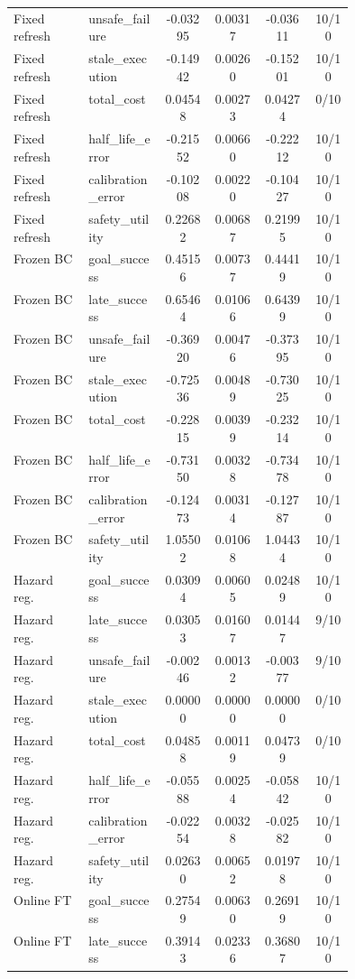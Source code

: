 \documentclass{article}
\begin{document}
\begin{center}
\begin{longtable}{p{0.22\linewidth}p{0.22\linewidth}cccc}
Fixed refresh & unsafe\_failure & -0.03295 & 0.00317 & -0.03611 & 10/10\\
Fixed refresh & stale\_execution & -0.14942 & 0.00260 & -0.15201 & 10/10\\
Fixed refresh & total\_cost & 0.04548 & 0.00273 & 0.04274 & 0/10\\
Fixed refresh & half\_life\_error & -0.21552 & 0.00660 & -0.22212 & 10/10\\
Fixed refresh & calibration\_error & -0.10208 & 0.00220 & -0.10427 & 10/10\\
Fixed refresh & safety\_utility & 0.22682 & 0.00687 & 0.21995 & 10/10\\
Frozen BC & goal\_success & 0.45156 & 0.00737 & 0.44419 & 10/10\\
Frozen BC & late\_success & 0.65464 & 0.01066 & 0.64399 & 10/10\\
Frozen BC & unsafe\_failure & -0.36920 & 0.00476 & -0.37395 & 10/10\\
Frozen BC & stale\_execution & -0.72536 & 0.00489 & -0.73025 & 10/10\\
Frozen BC & total\_cost & -0.22815 & 0.00399 & -0.23214 & 10/10\\
Frozen BC & half\_life\_error & -0.73150 & 0.00328 & -0.73478 & 10/10\\
Frozen BC & calibration\_error & -0.12473 & 0.00314 & -0.12787 & 10/10\\
Frozen BC & safety\_utility & 1.05502 & 0.01068 & 1.04434 & 10/10\\
Hazard reg. & goal\_success & 0.03094 & 0.00605 & 0.02489 & 10/10\\
Hazard reg. & late\_success & 0.03053 & 0.01607 & 0.01447 & 9/10\\
Hazard reg. & unsafe\_failure & -0.00246 & 0.00132 & -0.00377 & 9/10\\
Hazard reg. & stale\_execution & 0.00000 & 0.00000 & 0.00000 & 0/10\\
Hazard reg. & total\_cost & 0.04858 & 0.00119 & 0.04739 & 0/10\\
Hazard reg. & half\_life\_error & -0.05588 & 0.00254 & -0.05842 & 10/10\\
Hazard reg. & calibration\_error & -0.02254 & 0.00328 & -0.02582 & 10/10\\
Hazard reg. & safety\_utility & 0.02630 & 0.00652 & 0.01978 & 10/10\\
Online FT & goal\_success & 0.27549 & 0.00630 & 0.26919 & 10/10\\
Online FT & late\_success & 0.39143 & 0.02336 & 0.36807 & 10/10\\

\end{longtable}
\end{center}
\end{document}
